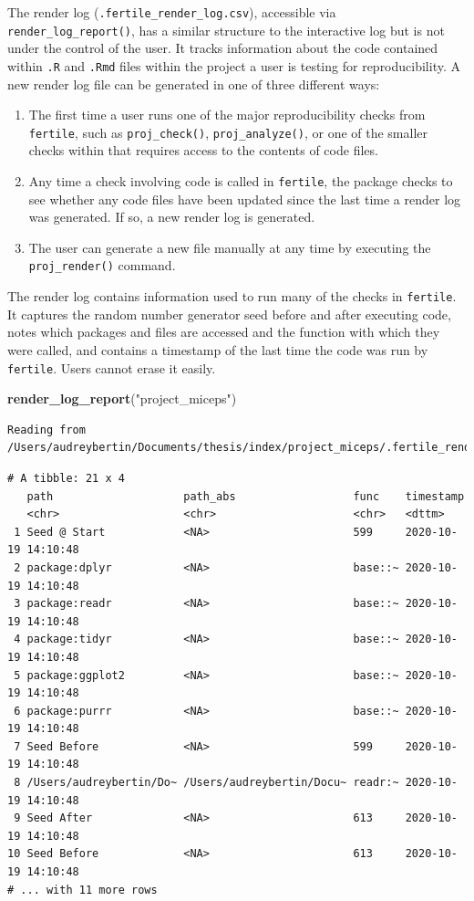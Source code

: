 \documentclass[12pt,twoside]{reedthesis}
\newenvironment{Shaded}{\begin{snugshade}}{\end{snugshade}}
\newcommand{\KeywordTok}[1]{\textcolor[rgb]{0.13,0.29,0.53}{\textbf{#1}}}
\newcommand{\StringTok}[1]{\textcolor[rgb]{0.31,0.60,0.02}{#1}}
\newcommand{\NormalTok}[1]{#1}
\begin{document}
The render log (\texttt{.fertile\_render\_log.csv}), accessible via
\texttt{render\_log\_report()}, has a similar structure to the
interactive log but is not under the control of the user. It tracks
information about the code contained within \texttt{.R} and
\texttt{.Rmd} files within the project a user is testing for
reproducibility. A new render log file can be generated in one of three
different ways:
\begin{enumerate}
\def\labelenumi{\arabic{enumi}.}
\item
  The first time a user runs one of the major reproducibility checks
  from \texttt{fertile}, such as \texttt{proj\_check()},
  \texttt{proj\_analyze()}, or one of the smaller checks within that
  requires access to the contents of code files.
\item
  Any time a check involving code is called in \texttt{fertile}, the
  package checks to see whether any code files have been updated since
  the last time a render log was generated. If so, a new render log is
  generated.
\item
  The user can generate a new file manually at any time by executing the
  \texttt{proj\_render()} command.
\end{enumerate}
The render log contains information used to run many of the checks in
\texttt{fertile}. It captures the random number generator seed before
and after executing code, notes which packages and files are accessed
and the function with which they were called, and contains a timestamp
of the last time the code was run by \texttt{fertile}. Users cannot
erase it easily.
\begin{Shaded}
\begin{Highlighting}[]
\KeywordTok{render_log_report}\NormalTok{(}\StringTok{"project_miceps"}\NormalTok{)}
\end{Highlighting}
\end{Shaded}
\begin{verbatim}
Reading from /Users/audreybertin/Documents/thesis/index/project_miceps/.fertile_render_log.csv
\end{verbatim}
\begin{verbatim}
# A tibble: 21 x 4
   path                    path_abs                  func    timestamp          
   <chr>                   <chr>                     <chr>   <dttm>             
 1 Seed @ Start            <NA>                      599     2020-10-19 14:10:48
 2 package:dplyr           <NA>                      base::~ 2020-10-19 14:10:48
 3 package:readr           <NA>                      base::~ 2020-10-19 14:10:48
 4 package:tidyr           <NA>                      base::~ 2020-10-19 14:10:48
 5 package:ggplot2         <NA>                      base::~ 2020-10-19 14:10:48
 6 package:purrr           <NA>                      base::~ 2020-10-19 14:10:48
 7 Seed Before             <NA>                      599     2020-10-19 14:10:48
 8 /Users/audreybertin/Do~ /Users/audreybertin/Docu~ readr:~ 2020-10-19 14:10:48
 9 Seed After              <NA>                      613     2020-10-19 14:10:48
10 Seed Before             <NA>                      613     2020-10-19 14:10:48
# ... with 11 more rows
\end{verbatim}
\end{document}
